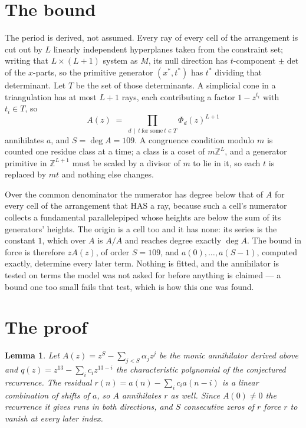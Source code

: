 \documentclass[11pt,a4paper]{article}
\theoremstyle{plain}
\newtheorem{lemma}[theorem]{Lemma}
\theoremstyle{definition}
\begin{document}
\section{The bound}

The period is derived, not assumed. Every ray of every cell of the arrangement is cut out by
$L$ linearly independent hyperplanes taken from the constraint set; writing that $L\times(L+1)$
system as $M$, its null direction has $t$-component $\pm\det$ of the $x$-parts, so the
primitive generator $(x^*,t^*)$ has $t^*$ dividing that determinant. Let $T$ be the set of
those determinants. A simplicial cone in a triangulation has at most $L+1$ rays, each
contributing a factor $1-z^{t_i}$ with $t_i\in T$, so
\[
A(z)\;=\;\prod_{d\,\mid\,t\ \text{for some}\ t\in T}\Phi_d(z)^{L+1}
\]
annihilates $a$, and $S=\deg A=109$. A congruence condition modulo $m$ is counted one residue
class at a time; a class is a coset of $m\mathbb{Z}^L$, and a generator primitive in
$\mathbb{Z}^{L+1}$ must be scaled by a divisor of $m$ to lie in it, so each $t$ is replaced
by $mt$ and nothing else changes.

Over the common denominator the numerator has degree below that of $A$ for every cell of the
arrangement that HAS a ray, because such a cell's numerator collects a fundamental
parallelepiped whose heights are below the sum of its generators' heights. The origin is a cell
too and it has none: its series is the constant $1$, which over $A$ is $A/A$ and reaches degree
exactly $\deg A$. The bound in force is therefore $zA(z)$, of order $S=109$, and
$a(0),\dots,a(S-1)$, computed exactly, determine every later term. Nothing is fitted, and the
annihilator is tested on terms the model was not asked for before anything is claimed --- a
bound one too small fails that test, which is how this one was found.

\section{The proof}

\begin{lemma}\label{lem:crit}
Let $A(z)=z^S-\sum_{j<S}\alpha_jz^{j}$ be the monic annihilator derived above and
$q(z)=z^{13}-\sum_ic_iz^{13-i}$ the characteristic polynomial of the conjectured
recurrence. The residual $r(n)=a(n)-\sum_ic_ia(n-i)$ is a linear combination of shifts of $a$,
so $A$ annihilates $r$ as well. Since $A(0)\ne0$ the recurrence it gives runs in both
directions, and $S$ consecutive zeros of $r$ force $r$ to vanish at every later index.
\end{lemma}
\end{document}
